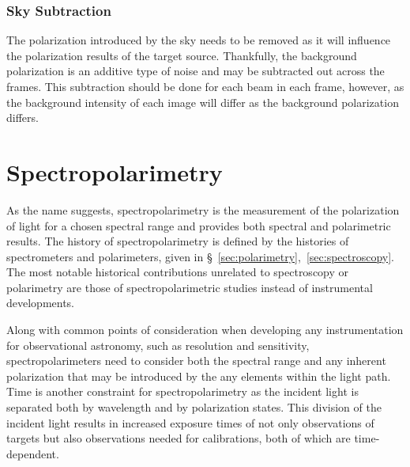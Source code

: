 \subsubsection{Sky Subtraction}\label{subsubsec:pol_sky_subtract}

The polarization introduced by the sky needs to be removed as it will influence the polarization results of the target source. Thankfully, the background polarization is an additive type of noise and may be subtracted out across the frames. This subtraction should be done for each beam in each frame, however, as the background intensity of each image will differ as the background polarization differs.


\section{Spectropolarimetry} \label{sec:spectropolarimetry} %

As the name suggests, spectropolarimetry is the measurement of the polarization of light for a chosen spectral range and provides both spectral and polarimetric results. The history of spectropolarimetry is defined by the histories of spectrometers and polarimeters, given in \S~\ref{sec:polarimetry},~\ref{sec:spectroscopy}. The most notable historical contributions unrelated to spectroscopy or polarimetry are those of spectropolarimetric studies instead of instrumental developments.
\prgph


Along with common points of consideration when developing any instrumentation for observational astronomy, such as resolution and sensitivity, spectropolarimeters need to consider both the spectral range and any inherent polarization that may be introduced by the any elements within the light path. Time is another constraint for spectropolarimetry as the incident light is separated both by wavelength and by polarization states. This division of the incident light results in increased exposure times of not only observations of targets but also observations needed for calibrations, both of which are time-dependent.

